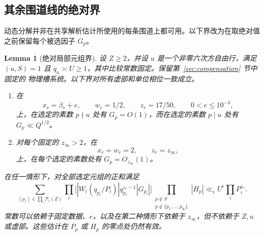 \documentclass[11pt,a4paper]{article}
\numberwithin{equation}{section}
\numberwithin{figure}{section}
\newtheorem{lemma}[theorem]{Lemma}
\theoremstyle{definition}
\theoremstyle{remark}
\begin{document}
\subsection{其余围道线的绝对界}

动态分解并非在共享解析估计所使用的每条围道上都可用。以下界改为在取绝对值之前保留每个被选因子 $G_p$。\begin{lemma}[绝对局部元组界]
\label{lem:compensated-absolute-local-bounds}
设 $Z\ge2$，并设 $u$ 是一个非零六次方自由行，满足 $(u,S)=1$ 且
$q_u\asymp U\ge1$，其中比较常数固定。保留第~\ref{sec:compensation} 节中固定的
物理槽系统。以下界对所有虚部和单位相位一致成立。
\begin{enumerate}
\item 在
\[
 x_r=\beta_*+e,\qquad w_r=1/2,\qquad z_r=17/50,
 \qquad 0<e\le10^{-3},
\]
上，在选定的素数 $p\nmid u$ 处有 $G_p=O(1)$，而在选定的素数 $p\mid u$ 处有
$G_p\ll Q^{1/2}$。
\item 对每个固定的 $z_\infty>2$，在
\[
 x_r=w_r=2,\qquad z_r=z_\infty,
\]
上，在每个选定的素数处有 $G_p=O_{z_\infty}(1)$。
\end{enumerate}
在任一情形下，对全部选定元组的正和满足
\begin{equation}\label{eq:absolute-local-tuple-bound}
 \sum_{(p_i)\in\prod_i\mathcal P_i(Z)}
       \prod_i\bigl[|W_i(q_{p_i}/P_i)|q_{p_i}^{z_r-1}|G_{p_i}|\bigr]
       \prod_{\substack{p\notin S\\p\notin\{p_1,\ldots,p_K\}}}|H_p|
 \ll_\epsilon U^\epsilon\prod_iP_i^{z_r}.
\end{equation}
常数可以依赖于固定数据、$e$，以及在第二种情形下依赖于 $z_\infty$，但不依赖于
$Z,u$ 或虚部。这些估计在 $P_p$ 或 $H_p$ 的零点处仍然有效。
\end{lemma}
\end{document}

